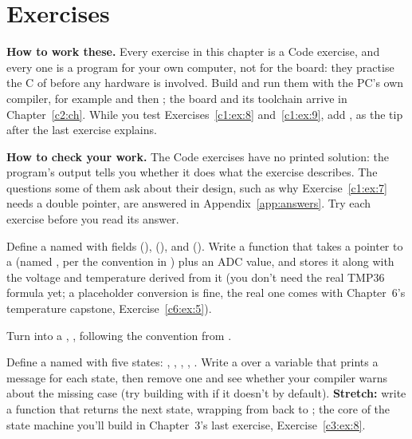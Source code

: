 
\section{Exercises}
\label{c1:sec:exercises}\label{c1:app:b}

\begin{aside}
\textbf{How to work these.} Every exercise in this chapter is a Code exercise, and every one is a
program for your own computer, not for the board: they practise the C of
 before any hardware is involved. Build and run them with the PC's own
compiler, for example  and then ; the
board and its toolchain arrive in Chapter~\ref{c2:ch}. While you test Exercises~\ref{c1:ex:8}
and~\ref{c1:ex:9}, add , as the tip after the last exercise explains.

\textbf{How to check your work.} The Code exercises have no printed solution: the program's output
tells you whether it does what the exercise describes. The questions some of them ask about their
design, such as why Exercise~\ref{c1:ex:7} needs a double pointer, are answered in
Appendix~\ref{app:answers}. Try each exercise before you read its answer.
\end{aside}

\label{c1:set:1}

\label{c1:ex:1}
Define a  named  with fields 
(),  (), and  ().
Write a  function  that takes a pointer to a
 (named , per the convention in ) plus an ADC value,
and stores it along with the voltage and temperature derived from it (you don't need the real
TMP36 formula yet; a placeholder conversion is fine, the real one comes with Chapter~6's
temperature capstone, Exercise~\ref{c6:ex:5}).

\label{c1:ex:2}
Turn  into a , , following the
 convention from .

\label{c1:ex:3}
Define a  named  with five states: ,
, , , . Write a 
over a  variable that prints a message for each state, then remove one 
and see whether your compiler warns about the missing case (try building with  if it
doesn't by default). \textbf{Stretch:} write a function  that returns the next
state, wrapping from  back to ; the core of the state machine you'll
build in Chapter~3's last exercise, Exercise~\ref{c3:ex:8}.

